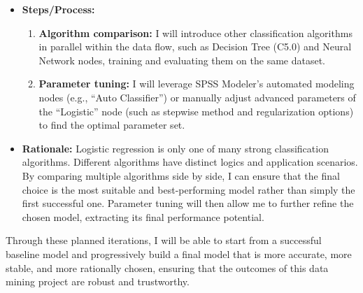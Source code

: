 \documentclass[sigplan,screen]{acmart}
\begin{document}
\begin{itemize}
    \item \textbf{Steps/Process:}
    \begin{enumerate}
        \item \textbf{Algorithm comparison:} I will introduce other classification algorithms in parallel within the data flow, such as Decision Tree (C5.0) and Neural Network nodes, training and evaluating them on the same dataset.
        \item \textbf{Parameter tuning:} I will leverage SPSS Modeler's automated modeling nodes (e.g., ``Auto Classifier'') or manually adjust advanced parameters of the ``Logistic'' node (such as stepwise method and regularization options) to find the optimal parameter set.
    \end{enumerate}
    \item \textbf{Rationale:} Logistic regression is only one of many strong classification algorithms. Different algorithms have distinct logics and application scenarios. By comparing multiple algorithms side by side, I can ensure that the final choice is the most suitable and best-performing model rather than simply the first successful one. Parameter tuning will then allow me to further refine the chosen model, extracting its final performance potential.
\end{itemize}

Through these planned iterations, I will be able to start from a successful baseline model and progressively build a final model that is more accurate, more stable, and more rationally chosen, ensuring that the outcomes of this data mining project are robust and trustworthy.


\end{document}
